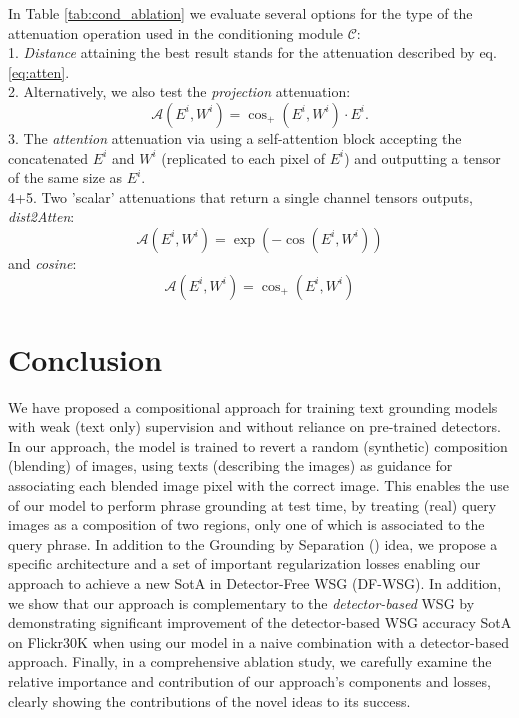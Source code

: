 \documentclass[10pt,twocolumn,letterpaper]{article}
\def\oursfull{Grounding by Separation }
\def\ourstask{DF-WSG}
\def\ourstaskfull{Detector-Free WSG }
\begin{document}
 In Table \ref{tab:cond_ablation} we evaluate several options for the type of the attenuation operation used in the conditioning module $\mathcal{C}$:\\ 1. \textit{Distance} attaining the best result stands for the attenuation described by eq. \eqref{eq:atten}. \\
2. Alternatively, we also test the \textit{projection} attenuation:
\begin{equation}
    \mathcal{A}(E^i,W^i) = \cos_{+}\left(E^i,W^i\right) \cdot E^i.
\end{equation}
3. The \textit{attention} attenuation via using a self-attention block accepting the concatenated $E^i$ and $W^i$ (replicated to each pixel of $E^i$) and outputting a tensor of the same size as $E^i$. \\
4+5. Two 'scalar' attenuations that return a single channel tensors outputs, \textit{dist2Atten}:
\begin{equation}
    \mathcal{A}(E^i,W^i) = \exp(- \cos\left(E^i,W^i\right))
\end{equation}
and \textit{cosine}:
\begin{equation}
    \mathcal{A}(E^i,W^i) = \cos_{+}\left(E^i,W^i\right)
\end{equation}

%
  \section{Conclusion}\label{sec:conclusions}
We have proposed a compositional approach for training text grounding models with weak (text only) supervision and without reliance on pre-trained detectors. In our \ours{} approach, the model is trained to revert a random (synthetic) composition (blending) of images, using texts (describing the images) as guidance for associating each blended image pixel with the correct image. 
This enables the use of our model to perform phrase grounding at test time, by treating (real) query images as a composition of two regions, only one of which is associated to the query phrase. In addition to the \oursfull (\ours) idea, we propose a specific architecture and a set of important regularization losses enabling our \ours{} approach to achieve a new SotA in \ourstaskfull{} (\ourstask{}). 
In addition, we show that our approach is complementary to the \textit{detector-based} WSG by demonstrating
significant
improvement of the detector-based WSG accuracy SotA on Flickr30K when using our \ours{} model in a naive combination with a detector-based approach. Finally, in a comprehensive ablation study, we carefully examine the relative importance and contribution of our approach's components and losses, clearly showing the contributions of the novel \ours{} ideas to its success.
\end{document}
